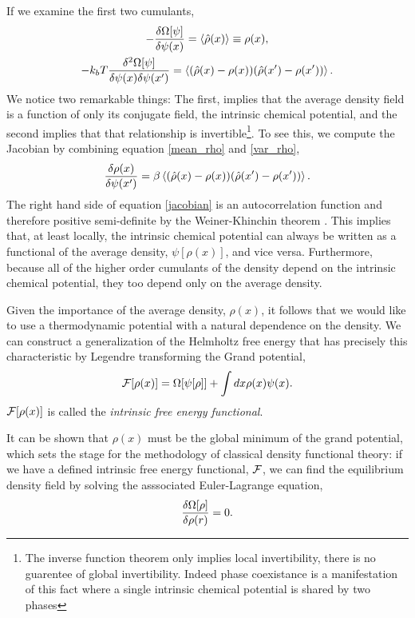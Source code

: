 If we examine the first two cumulants,
%
\begin{gather}
    \label{mean_rho}
    - \frac{\delta \Omega[\psi]}{\delta \psi(x)}
        = \left\langle \hat{\rho}(x) \right\rangle \equiv \rho(x), \\
    \label{var_rho} 
    -k_b T\frac{\delta^2 \Omega[\psi]}{\delta \psi(x) \delta \psi(x^\prime)}
        = \left\langle (\hat{\rho}(x) - \rho(x))
          (\hat{\rho}(x^\prime) - \rho(x^\prime)) \right\rangle.
\end{gather}
%
We notice two remarkable things: The first, implies that the average density
field is a function of only its conjugate field, the intrinsic chemical
potential, and the second implies that that relationship is
invertible\footnote{The inverse function theorem only implies local
invertibility, there is no guarentee of global invertibility. Indeed phase
coexistance is a manifestation of this fact where a single intrinsic chemical
potential is shared by two phases}.  To see this, we compute the Jacobian by
combining equation \ref{mean_rho} and \ref{var_rho},
%
\begin{equation}
    \label{jacobian}
    \frac{\delta \rho(x)}{\delta \psi(x^\prime)} 
        = \beta \left\langle (\hat{\rho}(x) - \rho(x))
        (\hat{\rho}(x^\prime) - \rho(x^\prime)) \right\rangle.
\end{equation}
%
The right hand side of equation \ref{jacobian} is an autocorrelation function
and therefore positive semi-definite by the Weiner-Khinchin theorem
\cite{ESPANOL09}. This implies that, at least locally, the intrinsic chemical
potential can always be written as a functional of the average density,
$\psi[\rho(x)]$, and vice versa.  Furthermore, because all of the higher order
cumulants of the density depend on the intrinsic chemical potential, they too
depend only on the average density.

Given the importance of the average density, $\rho(x)$, it follows that we
would like to use a thermodynamic potential with a natural dependence on the
density.  We can construct a generalization of the Helmholtz free energy that
has precisely this characteristic by Legendre transforming the Grand potential,
%
\begin{equation}
    \mathcal{F}[\rho(x)] = \Omega[\psi[\rho]] + \int dx \rho(x) \psi(x).
    \label{intrinsic_F}
\end{equation}
%
$\mathcal{F}[\rho(x)]$ is called the \textit{intrinsic free energy functional}.

It can be shown \cite{HansenAppendixB} that $\rho(x)$ must be the global
minimum of the grand potential, which sets the stage for the methodology of
classical density functional theory: if we have a defined intrinsic free energy
functional, $\mathcal{F}$, we can find the equilibrium density field by solving the
asssociated Euler-Lagrange equation, 
%
\begin{equation}
    \frac{\delta \Omega[\rho]}{\delta \rho(r)} = 0.
\label{fundamental_CDFT}
\end{equation}
%

